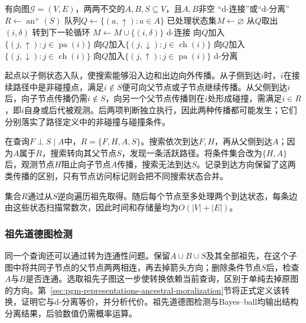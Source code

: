 \begin{algorithm}
  \label{alg:pgm-directed-bayes-ball}
  \begin{algorithmic}[1]
    \Require 有向图$\mathcal{G}=(V,E)$，两两不交的$A,B,S\subseteq V$，且$A,B$非空
    \Ensure “d-连接”或“d-分离”
    \State $R\gets\operatorname{an}^{+}(S)$
    \State 队列$Q\gets\{(a,\uparrow):a\in A\}$
    \State 已处理状态集$M\gets\varnothing$
      \State 从$Q$取出$(i,\delta)$
        \State 转到下一轮循环
      \EndIf
      \State $M\gets M\cup\{(i,\delta)\}$
        \State \Return d-连接
      \EndIf
        \State 向$Q$加入$\{(j,\uparrow):j\in\operatorname{pa}(i)\}$
        \State 向$Q$加入$\{(j,\downarrow):j\in\operatorname{ch}(i)\}$
      \ElsIf{$\delta=\downarrow$}
          \State 向$Q$加入$\{(j,\downarrow):j\in\operatorname{ch}(i)\}$
        \EndIf
          \State 向$Q$加入$\{(j,\uparrow):j\in\operatorname{pa}(i)\}$
        \EndIf
      \EndIf
    \EndWhile
    \State \Return d-分离
  \end{algorithmic}
\end{algorithm}

起点以子侧状态入队，使搜索能够沿入边和出边向外传播。从子侧到达$i$时，$i$在接续路径中是非碰撞点，满足$i\notin S$便可向父节点或子节点继续传播。从父侧到达$i$后，向子节点传播仍需$i\notin S$，向另一个父节点传播则在$i$处形成碰撞，需满足$i\in R$，即$i$自身或后代被观测。后两项判断独立执行，因此两种传播都可能发生；它们分别落实了路径定义中的非碰撞与碰撞条件。

在查询$F\perp S\mid A$中，$R=\{F,H,A,S\}$。搜索依次到达$F,H$，再从父侧到达$A$；因为$A$属于$R$，搜索转向其父节点$S$，发现一条活跃路径。将条件集合改为$\{H,A\}$后，观测节点$H$阻止向子节点$A$传播，搜索无法到达$S$。记录到达方向保留了这两类传播的区别，只有节点访问标记则会把不同搜索状态合并。

集合$R$通过从$S$逆向遍历祖先取得。随后每个节点至多处理两个到达状态，每条边由这些状态扫描常数次，因此时间和存储量均为$O(|V|+|E|)$。

\subsubsection{祖先道德图检测}
\label{sec:pgm-directed-ancestral-moral-test}
\label{sec:pgm-directed-undirected-test}

同一个查询还可以通过转为连通性问题。保留$A\cup B\cup S$及其全部祖先，在这个子图中将共同子节点的父节点两两相连，再去掉箭头方向；删除条件节点$S$后，检查$A$与$B$是否连通。选取祖先子图这一步使转换依赖当前查询，区别于单纯去掉原图的方向。第~\ref{sec:pgm-representations-ancestral-moralization}节将正式定义该转换，证明它与d-分离等价，并分析代价。祖先道德图检测与Bayes--ball均输出结构分离结果，后验数值仍需概率运算。

